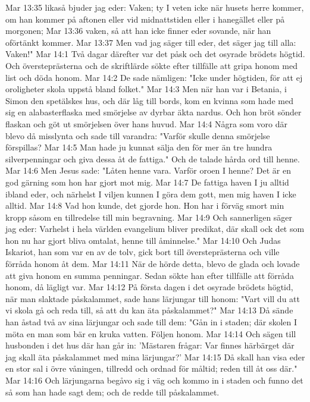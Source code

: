 Mar 13:35  likaså bjuder jag eder: Vaken; ty I veten icke när husets herre kommer, om han kommer på aftonen eller vid midnattstiden eller i hanegället eller på morgonen;
Mar 13:36  vaken, så att han icke finner eder sovande, när han oförtänkt kommer.
Mar 13:37  Men vad jag säger till eder, det säger jag till alla: Vaken!"
Mar 14:1  Två dagar därefter var det påsk och det osyrade brödets högtid. Och översteprästerna och de skriftlärde sökte efter tillfälle att gripa honom med list och döda honom.
Mar 14:2  De sade nämligen: "Icke under högtiden, för att ej oroligheter skola uppstå bland folket."
Mar 14:3  Men när han var i Betania, i Simon den spetälskes hus, och där låg till bords, kom en kvinna som hade med sig en alabasterflaska med smörjelse av dyrbar äkta nardus. Och hon bröt sönder flaskan och göt ut smörjelsen över hans huvud.
Mar 14:4  Några som voro där blevo då misslynta och sade till varandra: "Varför skulle denna smörjelse förspillas?
Mar 14:5  Man hade ju kunnat sälja den för mer än tre hundra silverpenningar och giva dessa åt de fattiga." Och de talade hårda ord till henne.
Mar 14:6  Men Jesus sade: "Låten henne vara. Varför oroen I henne? Det är en god gärning som hon har gjort mot mig.
Mar 14:7  De fattiga haven I ju alltid ibland eder, och närhelst I viljen kunnen I göra dem gott, men mig haven I icke alltid.
Mar 14:8  Vad hon kunde, det gjorde hon. Hon har i förväg smort min kropp såsom en tillredelse till min begravning.
Mar 14:9  Och sannerligen säger jag eder: Varhelst i hela världen evangelium bliver predikat, där skall ock det som hon nu har gjort bliva omtalat, henne till åminnelse."
Mar 14:10  Och Judas Iskariot, han som var en av de tolv, gick bort till översteprästerna och ville förråda honom åt dem.
Mar 14:11  När de hörde detta, blevo de glada och lovade att giva honom en summa penningar. Sedan sökte han efter tillfälle att förråda honom, då lägligt var.
Mar 14:12  På första dagen i det osyrade brödets högtid, när man slaktade påskalammet, sade hans lärjungar till honom: "Vart vill du att vi skola gå och reda till, så att du kan äta påskalammet?"
Mar 14:13  Då sände han åstad två av sina lärjungar och sade till dem: "Gån in i staden; där skolen I möta en man som bär en kruka vatten. Följen honom.
Mar 14:14  Och sägen till husbonden i det hus där han går in: 'Mästaren frågar: Var finnes härbärget där jag skall äta påskalammet med mina lärjungar?'
Mar 14:15  Då skall han visa eder en stor sal i övre våningen, tillredd och ordnad för måltid; reden till åt oss där."
Mar 14:16  Och lärjungarna begåvo sig i väg och kommo in i staden och funno det så som han hade sagt dem; och de redde till påskalammet.
